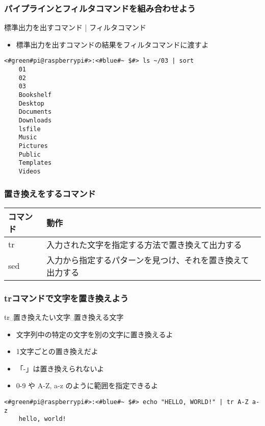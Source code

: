 \begin{frame}[fragile]
    \frametitle{パイプラインとフィルタコマンドを組み合わせよう}
    標準出力を出すコマンド | フィルタコマンド
    \begin{itemize}
        \item 標準出力を出すコマンドの結果をフィルタコマンドに渡すよ
    \end{itemize}
    \begin{lstlisting}[title=パイプラインを用いたsortコマンドの実行例, label=sort_example]
    <#green#pi@raspberrypi#>:<#blue#~ $#> ls ~/03 | sort
    01
    02
    03
    Bookshelf
    Desktop
    Documents
    Downloads
    lsfile
    Music
    Pictures
    Public
    Templates
    Videos
    \end{lstlisting}
\end{frame}

\begin{frame}
    \frametitle{置き換えをするコマンド}
    \begin{tabular}{ll}
        コマンド & 動作                                                       \\ \hline
        tr       & 入力された文字を指定する方法で置き換えて出力する           \\
        sed      & 入力から指定するパターンを見つけ、それを置き換えて出力する \\ \hline
    \end{tabular}
\end{frame}

\begin{frame}[fragile]
    \frametitle{trコマンドで文字を置き換えよう}
    tr␣置き換えたい文字␣置き換える文字
    \begin{itemize}
        \item 文字列中の特定の文字を別の文字に置き換えるよ
        \item 1文字ごとの置き換えだよ
        \item 「-」は置き換えられないよ
        \item 0-9 や A-Z, a-z のように範囲を指定できるよ
    \end{itemize}
    \begin{lstlisting}[title=範囲指定を使った置き換え, label=tr_range]
    <#green#pi@raspberrypi#>:<#blue#~ $#> echo "HELLO, WORLD!" | tr A-Z a-z
    hello, world!
    \end{lstlisting}
\end{frame}

